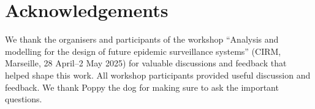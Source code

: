 \documentclass{article}
\begin{document}
\section{Acknowledgements}

We thank the organisers and participants of the workshop ``Analysis and modelling for the design of future epidemic surveillance systems'' (CIRM, Marseille, 28 April–2 May 2025) for valuable discussions and feedback that helped shape this work.
All workshop participants provided useful discussion and feedback.
We thank Poppy the dog for making sure to ask the important questions.
\pagebreak


\end{document}

